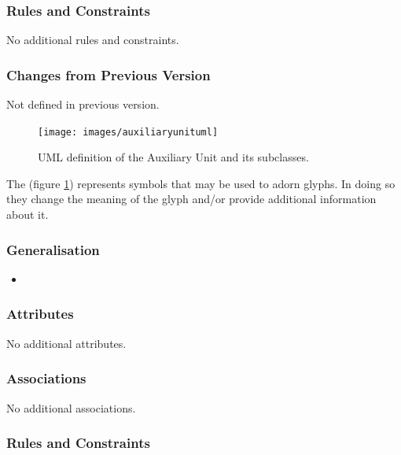 \subsubsection{Rules and Constraints}

No additional rules and constraints.

\subsubsection{Changes from Previous Version}

Not defined in  previous version.


\label{defn:AuxiliaryUnit}

\begin{figure}[htb]
  \centering
  \texttt{[image: images/auxiliaryunituml]}
\caption{UML definition of the Auxiliary Unit and its subclasses.}
  \label{fig:techref:auxiliaryunituml}
\end{figure}

 The  (figure \ref{fig:techref:auxiliaryunituml}) represents symbols that may be used to
adorn glyphs. In doing so they change the meaning of the glyph and/or provide
additional information about it.

\subsubsection{Generalisation}

\begin{itemize}
\item {}
\end{itemize}

\subsubsection{Attributes}

No additional attributes.

\subsubsection{Associations}

No additional associations.

\subsubsection{Rules and Constraints}

